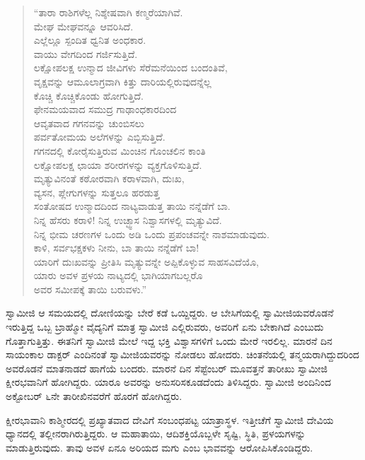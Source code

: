\begin{verse}
{\fontsize{11pt}{13.75pt}\selectfont
“ತಾರಾ ರಾಶಿಗಳೆಲ್ಲ ನಿಶ್ಶೇಷವಾಗಿ ಕಣ್ಮರೆಯಾಗಿವೆ.\\ಮೇಘ ಮೇಘವನ್ನೂ ಆವರಿಸಿದೆ.\\ಎಲ್ಲೆಲ್ಲೂ ಸ್ಪಂದಿತ ಧ್ವನಿತ ಅಂಧಕಾರ.\\ವಾಯು ವೇಗದಿಂದ ಗರ್ಜಿಸುತ್ತಿದೆ.\\ಲಕ್ಷೋಪಲಕ್ಷ ಉನ್ಮಾದ ಜೀವಿಗಳು ಸೆರೆಮನೆಯಿಂದ ಬಂದಂತಿವೆ,\\ವೃಕ್ಷವನ್ನು ಆಮೂಲಾಗ್ರವಾಗಿ ಕಿತ್ತು ದಾರಿಯಲ್ಲಿರುವುದನ್ನೆಲ್ಲ\\ ಕೊಚ್ಚಿ ಕೊಚ್ಚಿಕೊಂಡು ಹೋಗುತ್ತಿದೆ.\\ಫೇನಮಯವಾದ ಸಮುದ್ರ ಗಾಢಾಂಧಕಾರದಿಂದ\\ ಆವೃತವಾದ ಗಗನವನ್ನು ಚುಂಬಿಸಲು\\ಪರ್ವತೋಮಯ ಅಲೆಗಳನ್ನು ಎಬ್ಬಿಸುತ್ತಿದೆ.\\ಗಗನದಲ್ಲಿ ಕೋರೈಸುತ್ತಿರುವ ಮಿಂಚಿನ ಗೊಂಚಲಿನ ಕಾಂತಿ\\ಲಕ್ಷೋಪಲಕ್ಷ ಛಾಯಾ ಶರೀರಗಳನ್ನು ವ್ಯಕ್ತಗೊಳಿಸುತ್ತಿದೆ.\\ಮೃತ್ಯುವಿನಂತೆ ಕಠೋರವಾಗಿ ಕರಾಳವಾಗಿ, ದುಃಖ,\\ ವ್ಯಸನ, ಪ್ಲೇಗುಗಳನ್ನು ಸುತ್ತಲೂ ಹರಡುತ್ತ\\ಸಂತೋಷದ ಉನ್ಮಾದದಿಂದ ನಾಟ್ಯವಾಡುತ್ತ ತಾಯಿ ನನ್ನೆಡೆಗೆ ಬಾ.\\ನಿನ್ನ ಹೆಸರು ಕರಾಳಿ! ನಿನ್ನ ಉಚ್ಛ್ವಾಸ ನಿಶ್ವಾಸಗಳಲ್ಲಿ ಮೃತ್ಯುವಿದೆ.\\ನಿನ್ನ ಭೀಮ ಚರಣಗಳ ಒಂದು ಅಡಿ ಒಂದು ಪ್ರಪಂಚವನ್ನೇ ನಾಶಮಾಡುವುದು.\\ಕಾಳಿ, ಸರ್ವಭಕ್ಷಕಳು ನೀನು, ಬಾ ತಾಯಿ ನನ್ನೆಡೆಗೆ ಬಾ!\\ಯಾರಿಗೆ ದುಃಖವನ್ನು ಪ್ರೀತಿಸಿ ಮೃತ್ಯುವನ್ನೇ ಅಪ್ಪಿಕೊಳ್ಳುವ ಸಾಹಸವಿದೆಯೊ,\\ಯಾರು ಅವಳ ಪ್ರಳಯ ನಾಟ್ಯದಲ್ಲಿ ಭಾಗಿಯಾಗಬಲ್ಲರೊ\\ಅವರ ಸಮೀಪಕ್ಕೆ ತಾಯಿ ಬರುವಳು.”}
\end{verse}

 ಸ್ವಾಮೀಜಿ ಆ ಸಮಯದಲ್ಲಿ ದೋಣಿಯನ್ನು ಬೇರೆ ಕಡೆ ಒಯ್ದಿದ್ದರು. ಆ ಬೇಸಿಗೆಯಲ್ಲಿ ಸ್ವಾಮೀಜಿಯವರೊಡನೆ ಇರುತ್ತಿದ್ದ ಒಬ್ಬ ಬ್ರಾಹ್ಮೋ ವೈದ್ಯನಿಗೆ ಮಾತ್ರ ಸ್ವಾಮೀಜಿ ಎಲ್ಲಿರುವರು, ಅವರಿಗೆ ಏನು ಬೇಕಾಗಿದೆ ಎಂಬುದು ಗೊತ್ತಾಗುತ್ತಿತ್ತು. ಈತನಿಗೆ ಸ್ವಾಮೀಜಿ ಮೇಲೆ ಇದ್ದ ಭಕ್ತಿ ವಿಶ್ವಾಸಗಳಿಗೆ ಒಂದು ಮೇರೆ ಇರಲಿಲ್ಲ. ಮಾರನೆ ದಿನ ಸಾಯಂಕಾಲ ಡಾಕ್ಟರ್ ಎಂದಿನಂತೆ ಸ್ವಾಮೀಜಿಯವರನ್ನು ನೋಡಲು ಹೋದರು. ಚಿಂತನೆಯಲ್ಲಿ ತನ್ಮಯರಾಗಿದ್ದುದರಿಂದ ಅವರೊಡನೆ ಮಾತನಾಡದೆ ಹಾಗೆಯೆ ಬಂದರು. ಮಾರನೆ ದಿನ ಸೆಪ್ಟೆಂಬರ್ ಮೂವತ್ತನೆ ತಾರೀಖು ಸ್ವಾಮೀಜಿ ಕ್ಷೀರಭವಾನಿಗೆ ಹೋಗಿದ್ದರು. ಯಾರೂ ಅವರನ್ನು ಅನುಸರಿಸಕೂಡದೆಂದು ತಿಳಿಸಿದ್ದರು. ಸ್ವಾಮೀಜಿ ಅಂದಿನಿಂದ ಅಕ್ಟೋಬರ್ ೬ನೇ ತಾರೀಖಿನವರೆಗೆ ಹೊರಗೆ ಹೋಗಿದ್ದರು. 

 ಕ್ಷೀರಭಾವಾನಿ ಕಾಶ್ಮೀರದಲ್ಲಿ ಪ್ರಖ್ಯಾತವಾದ ದೇವಿಗೆ ಸಂಬಂಧಪಟ್ಟ ಯಾತ್ರಾಸ್ಥಳ. ಇತ್ತೀಚೆಗೆ ಸ್ವಾಮೀಜಿ ದೇವಿಯ ಧ್ಯಾನದಲ್ಲಿ ತಲ್ಲೀನರಾಗಿರುತ್ತಿದ್ದರು. ಆ ಮಹಾತಾಯಿ, ಆದಿಶಕ್ತಿಯೊಬ್ಬಳೇ ಸೃಷ್ಟಿ, ಸ್ಥಿತಿ, ಪ್ರಳಯಗಳನ್ನು ಮಾಡುತ್ತಿರುವುದು. ತಾವು ಅವಳ ಏನೂ ಅರಿಯದ ಮಗು ಎಂಬ ಭಾವವನ್ನು ಆರೋಪಿಸಿಕೊಂಡಿದ್ದರು. 

